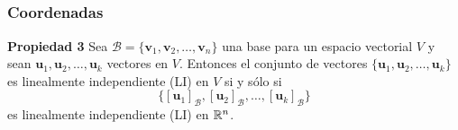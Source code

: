 
\subsection{}

\begin{frame}\frametitle{Coordenadas}
	
	\begin{prop}{\textbf{Propiedad 3}} \justifying
		Sea $\mathcal{B}=\{\mathbf{v}_1, \mathbf{v}_2, \hdots , \mathbf{v}_n \}$ una base para un espacio vectorial $V$
		y sean $\mathbf{u}_1, \mathbf{u}_2, \hdots , \mathbf{u}_k$ vectores en $V$. Entonces el conjunto de vectores
		$\{\mathbf{u}_1, \mathbf{u}_2, \hdots , \mathbf{u}_k \}$ es linealmente independiente (LI) en $V$ si y sólo si
		\[
			\{{[\mathbf{u}_1]}_{\mathcal{B}}, {[\mathbf{u}_2]}_{\mathcal{B}}, \hdots , {[\mathbf{u}_k]}_{\mathcal{B}} \}
		\]
		es linealmente independiente (LI) en $\mathbb{R}^n$.
	\end{prop}	
	
\end{frame}


